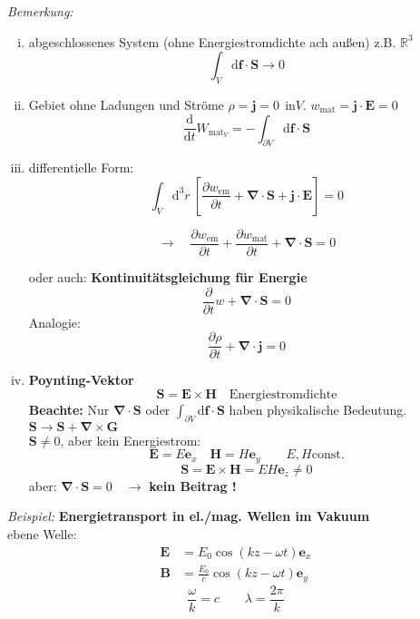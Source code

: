 \documentclass[titlepage,11pt,a4paper,ngerman]{report}
\newcommand{\tx}[1]{\textrm{#1}}
\newcommand{\const}{\tx{const.}}
\newcommand{\dd}{\tx{d}}
\newcommand{\prt}[2]{\frac{\partial #1}{\partial #2}}
\newcommand{\prd}[2]{\frac{\tx{d} #1}{\tx{d} #2}}
\renewcommand{\vec}[1]{\boldsymbol{#1}}
\newcommand{\vabla}{\boldsymbol{\nabla}}
\newcommand{\frbox}[2]{\begin{tcolorbox}[colback=white,colframe=red!75!black,fonttitle=\bfseries,title=#1]#2\end{tcolorbox}}
\begin{document}
\noindent
\emph{Bemerkung:}
\begin{enumerate}[i)]
	\item abgeschlossenes System (ohne Energiestromdichte ach außen) z.B. $ \mathbb{R}^3 $
	\begin{equation*}
	\int_V \dd \vec{f} \cdot \vec{S} \rightarrow 0
	\end{equation*}
	\item Gebiet ohne Ladungen und Ströme $ \rho = \vec{j} = 0 \ \ \tx{in} V $. $ w_{\tx{mat}} = \vec{j} \cdot \vec{E} = 0 $
	\begin{equation*}
	\prd{}{t} W_{\tx{mat}_V} = - \int_{\partial V} \dd \vec{f} \cdot \vec{S}
	\end{equation*}
	\item differentielle Form:
	\begin{equation*}
	\int_V \dd^3 r \ \left[\prt{w_{\tx{em}}}{t} + \vabla \cdot \vec{S} + \vec{j} \cdot \vec{E}\right] = 0
	\end{equation*}
	\frbox{Poyntigsches Theorem}{
	\begin{equation*}
	\rightarrow \quad \prt{w_{\tx{em}}}{t} + \prt{w_{\tx{mat}}}{t} + \vabla \cdot \vec{S} = 0
	\end{equation*}}
	oder auch: \textbf{Kontinuitätsgleichung für Energie}
	\begin{equation*}
	\prt{}{t} w + \vabla \cdot \vec{S} = 0
	\end{equation*}
	Analogie:
	\begin{equation*}
	\prt{\rho}{t} + \vabla \cdot \vec{j} = 0
	\end{equation*}
	\item \textbf{Poynting-Vektor}
	\begin{equation*}
	\vec{S} = \vec{E} \times \vec{H} \quad \tx{Energiestromdichte}
	\end{equation*}
	\textbf{Beachte:} Nur $ \vabla \cdot \vec{S} $ oder $ \int_{\partial V} \dd \vec{f} \cdot \vec{S} $ haben physikalische Bedeutung.\\[5pt]
	$ \vec{S} \to \vec{S} + \vabla \times \vec{G} $\\
	$ \vec{S} \neq 0 $, aber kein Energiestrom:
	\begin{equation*}
	\vec{E} = E \vec{e}_x \quad \vec{H} = H \vec{e}_y \qquad E,H \const
	\end{equation*}
	\begin{equation*}
	\vec{S} = \vec{E} \times \vec{H} = E H \vec{e}_z \neq 0
	\end{equation*}
	aber: $ \vabla \cdot \vec{S} = 0  \quad \rightarrow $ \textbf{kein Beitrag !}
\end{enumerate}
\emph{Beispiel:} \textbf{Energietransport in el./mag. Wellen im Vakuum}\\[5pt]
ebene Welle:
\begin{align*}
\vec{E} &= E_0 \cos(kz - \omega t) \vec{e}_x \\
\vec{B} &= \frac{E_0}{c} \cos(kz - \omega t) \vec{e}_y
\end{align*}
\begin{equation*}
\frac{\omega}{k} = c \qquad \lambda = \frac{2 \pi}{k}
\end{equation*}
\end{document}

